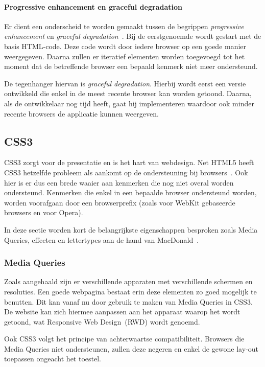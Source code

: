 \paragraph{Progressive enhancement en graceful degradation}
\label{par:progressive-enhancement}
Er dient een onderscheid te worden gemaakt tussen de begrippen \emph{progressive enhancement} en \emph{graceful degradation}~\cite{Hens2012}. 
Bij de eerstgenoemde wordt gestart met de basis HTML-code.
Deze code wordt door iedere browser op een goede manier weergegeven. 
Daarna zullen er iteratief elementen worden toegevoegd tot het moment dat de betreffende browser een bepaald kenmerk niet meer ondersteund.

De tegenhanger hiervan is \emph{graceful degradation}. 
Hierbij wordt eerst een versie ontwikkeld die enkel in de meest recente browser kan worden getoond. 
Daarna, als de ontwikkelaar nog tijd heeft, gaat hij  implementeren waardoor ook minder recente browsers de applicatie kunnen weergeven.

\subsection{CSS3}
\label{ref:css3}
CSS3 zorgt voor de presentatie en is het hart van webdesign. 
Net HTML5 heeft CSS3 hetzelfde probleem als aankomt op de ondersteuning bij browsers~\cite{MacDonald2011}. 
Ook hier is er dus een brede waaier aan kenmerken die nog niet overal worden ondersteund. 
Kenmerken die enkel in een bepaalde browser ondersteund worden, worden voorafgaan door een browserprefix (zoals  voor WebKit gebaseerde browsers en  voor Opera).

In deze sectie worden kort de belangrijkste eigenschappen besproken zoals Media Queries, effecten en lettertypes aan de hand van MacDonald~\cite{MacDonald2011}.

\subsubsection{Media Queries}
Zoals aangehaald zijn er verschillende apparaten met verschillende schermen en resoluties. 
Een goede webpagina bestaat erin deze elementen zo goed mogelijk te benutten. 
Dit kan vanaf nu door gebruik te maken van Media Queries in CSS3. 
De website kan zich hiermee aanpassen aan het apparaat waarop het wordt getoond, wat  Responsive Web Design~(RWD) wordt genoemd.

Ook CSS3 volgt het principe van achterwaartse compatibiliteit. 
Browsers die Media Queries niet ondersteunen, zullen deze negeren en enkel de gewone lay-out toepassen ongeacht het toestel.

